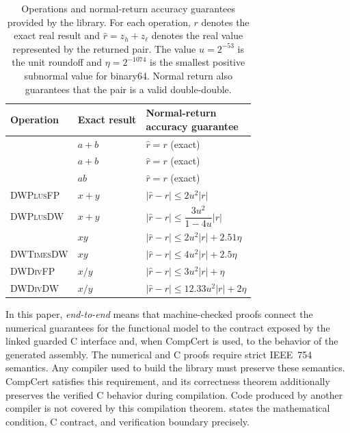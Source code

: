 \begin{table}[t]
\centering
\caption{Operations and normal-return accuracy guarantees provided by the
library.  For each operation, $r$ denotes the exact real result and
$\widehat r=z_h+z_\ell$ denotes the real value represented by the returned
pair.  The value $u=2^{-53}$ is the unit roundoff and $\eta=2^{-1074}$ is the
smallest positive subnormal value for binary64.  Normal return also guarantees
that the pair is a valid double-double.}
\label{tab:operation-preview}
\small
\begin{tabular}{@{}lll@{}}
\toprule
Operation & Exact result &
  \shortstack[l]{Normal-return\\accuracy guarantee} \\
\midrule
\TwoSum{}         & $a+b$ & $\widehat r=r$ (exact) \\
\FastTwoSum{}     & $a+b$ & $\widehat r=r$ (exact) \\
\FastTwoMult{}    & $ab$  & $\widehat r=r$ (exact) \\
\addlinespace
\textsc{DWPlusFP} & $x+y$ &
  $|\widehat r-r|\leq 2u^2|r|$ \\
\textsc{DWPlusDW} & $x+y$ &
  $|\widehat r-r|\leq \dfrac{3u^2}{1-4u}|r|$ \\
\DWTimesFP{}       & $xy$ &
  $|\widehat r-r|\leq 2u^2|r|+2.51\eta$ \\
\textsc{DWTimesDW} & $xy$ &
  $|\widehat r-r|\leq 4u^2|r|+2.5\eta$ \\
\textsc{DWDivFP}  & $x/y$ &
  $|\widehat r-r|\leq 3u^2|r|+\eta$ \\
\textsc{DWDivDW}  & $x/y$ &
  $|\widehat r-r|\leq 12.33u^2|r|+2\eta$ \\
\bottomrule
\end{tabular}
\end{table}

In this paper, \emph{end-to-end} means that machine-checked proofs connect the
numerical guarantees for the functional model to the contract exposed by the
linked guarded C interface and, when CompCert is used, to the behavior of the
generated assembly.  The numerical and C proofs require strict IEEE~754
semantics.  Any compiler used to build the library must preserve these
semantics.  CompCert satisfies this requirement, and its correctness theorem
additionally preserves the verified C behavior during compilation.  Code
produced by another compiler is not covered by this compilation theorem.
 states the mathematical condition, C contract, and
verification boundary precisely.
